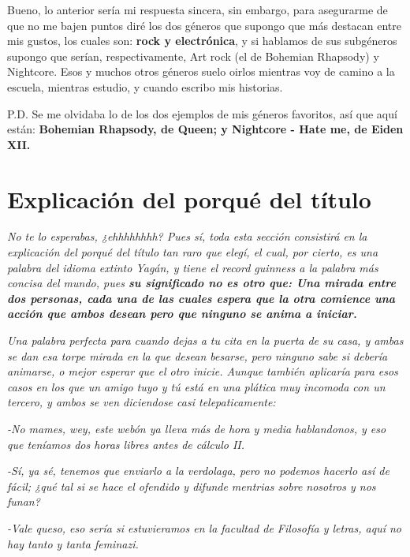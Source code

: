 \documentclass[12pt,letterpaper]{article}
\begin{document}
{\textrm{Bueno, lo anterior sería mi respuesta sincera, sin embargo, para asegurarme de que no me bajen puntos diré los dos géneros que supongo que más destacan entre mis gustos, los cuales son: {\large{\textbf{rock y electrónica}}}, y si hablamos de sus subgéneros supongo que serían, respectivamente, Art rock (el de Bohemian Rhapsody) y Nightcore. Esos y muchos otros géneros suelo oirlos mientras voy de camino a la escuela, mientras estudio, y cuando escribo mis historias.\\}}

{\textrm{P.D. Se me olvidaba lo de los dos ejemplos de mis géneros favoritos, así que aquí están: {\large{\textbf{Bohemian Rhapsody, de Queen; y Nightcore - Hate me, de Eiden XII.}}}}}

\section{\Huge{\textbf{Explicación del porqué del título}}}

{\textit{No te lo esperabas, ¿ehhhhhhhh? Pues sí, toda esta sección consistirá en la explicación del porqué del título tan raro que elegí, el cual, por cierto, es una palabra del idioma extinto Yagán, y tiene el record guinness a la palabra más concisa del mundo, pues {\large{\textbf{su significado no es otro que: Una mirada entre dos personas, cada una de las cuales espera que la otra comience una acción que ambos desean pero que ninguno se anima a iniciar.\\}}}}}

{\textit{Una palabra perfecta para cuando dejas a tu cita en la puerta de su casa, y ambas se dan esa torpe mirada en la que desean besarse, pero ninguno sabe si debería animarse, o mejor esperar que el otro inicie. Aunque también aplicaría para esos casos en los que un amigo tuyo y tú está en una plática muy incomoda con un tercero, y ambos se ven diciendose casi telepaticamente:\\}}

{\small{\textit{-No mames, wey, este webón ya lleva más de hora y media hablandonos, y eso que teníamos dos horas libres antes de cálculo II.\\}}}

{\small{\textit{-Sí, ya sé, tenemos que enviarlo a la verdolaga, pero no podemos hacerlo así de fácil; ¿qué tal si se hace el ofendido y difunde mentrias sobre nosotros y nos funan?\\}}}

{\small{\textit{-Vale queso, eso sería si estuvieramos en la facultad de Filosofía y letras, aquí no hay tanto y tanta feminazi.\\}}}
\end{document}
